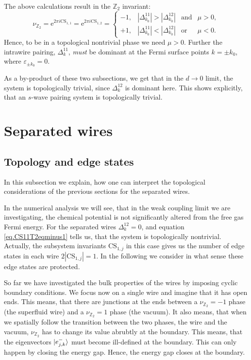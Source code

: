 The above calculations result in the $\mathbb{Z}_2$ invariant:
\begin{equation}
\nu_{\mathbb{Z}_2} = \text{e}^{2\pi i \text{CS}_{1,1}} = \text{e}^{2\pi i \text{CS}_{1,2}} = \left\{ \begin{matrix} 
-1, & |\Delta^{11}_{k_0}| > |\Delta^{12}_{k_0}| & \text{and} & \mu > 0, \\
+1, & |\Delta^{11}_{k_0}| < |\Delta^{12}_{k_0}| & \text{or}  & \mu < 0.
  \end{matrix} \right.
\label{eq.CS11T2eqminus1}
\end{equation}
Hence, to be in a topological nontrivial phase we need $\mu > 0$. Further the intrawire pairing, $\Delta^{11}_k$, \textit{must} be dominant at the Fermi surface points $k = \pm k_0$, where $\varepsilon_{\pm k_0} = 0$. 

As a by-product of these two subsections, we get that in the $d \to 0$ limit, the system is topologically trivial, since $\Delta^{12}_k$ is dominant here. This shows explicitly, that an $s$-wave pairing system is topologically trivial. 

\section{Separated wires} \label{sec.separatedwires}

\subsection{Topology and edge states} \label{subsec.topologyandedgestates}
In this subsection we explain, how one can interpret the topological considerations of the previous sections for the separated wires. 

In the numerical analysis we will see, that in the weak coupling limit we are investigating, the chemical potential is not significantly altered from the free gas Fermi energy. For the separated wires $\Delta^{12}_k = 0$, and equation \eqref{eq.CS11T2eqminus1} tells us, that the system is topologically nontrivial. Actually, the subsystem invariants $\text{CS}_{1,j}$ in this case gives us the number of edge states in each wire $2|\text{CS}_{1,j}| = 1$. In the following we consider in what sense these edge states are protected. 

So far we have investigated the bulk properties of the wires by imposing cyclic boundary conditions. We focus now on a single wire and imagine that it has open ends. This means, that there are junctions at the ends between a $\nu_{\mathbb{Z}_2} = -1$ phase (the superfluid wire) and a $\nu_{\mathbb{Z}_2} = 1$ phase (the vacuum). It also means, that when we spatially follow the transition between the two phases, the wire and the vacuum, $\nu_{\mathbb{Z}_2}$ has to change its value abrubtly at the boundary. This means, that the eigenvectors $\ket{e^{-}_{j,k}}$ must become ill-defined at the boundary. This can only happen by closing the energy gap. Hence, the energy gap closes at the boundary.  

